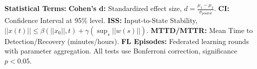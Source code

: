 \documentclass[12pt]{article}
\begin{document}
\textbf{Statistical Terms:} \textbf{Cohen's d:} Standardized effect size, $d = \frac{\mu_1-\mu_2}{\sigma_{pooled}}$. \textbf{CI:} Confidence Interval at 95\% level. \textbf{ISS:} Input-to-State Stability, $||x(t)|| \leq \beta(||x_0||,t) + \gamma(\sup_s ||w(s)||)$. \textbf{MTTD/MTTR:} Mean Time to Detection/Recovery (minutes/hours). \textbf{FL Episodes:} Federated learning rounds with parameter aggregation. All tests use Bonferroni correction, significance $p<0.05$.



\end{document}
